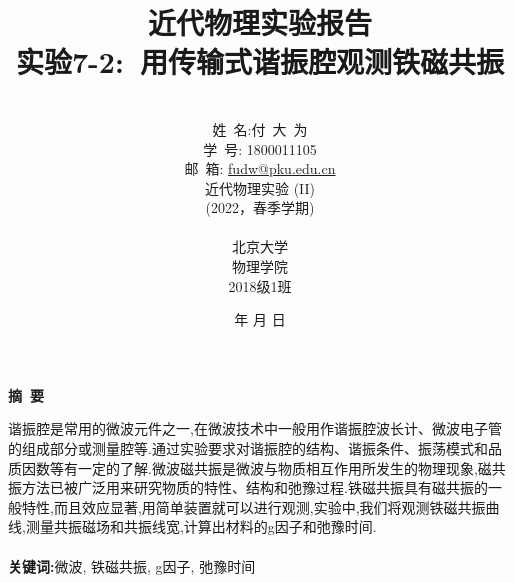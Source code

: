\documentclass[a4paper]{article}
\begin{document}
\setlength{\abovecaptionskip}{0pt}
\setlength{\belowcaptionskip}{0pt}
\renewcommand{\contentsname}{目\ 录}
\renewcommand{\appendixname}{附录}
\renewcommand{\appendixpagename}{附录}
\renewcommand{\refname}{参考文献} 
\renewcommand{\figurename}{图}
\renewcommand{\tablename}{表}
\renewcommand{\today}{\number\year 年 \number\month 月 \number\day 日}
\newcommand{\refeq}[1]{\textbf{Eq.(\ref{#1})}}
\newcommand*{\circled}[1]{\lower.7ex\hbox{\tikz\draw (0pt, 0pt)%
    circle (.5em) node {\makebox[1em][c]{\small #1}};}}
\title{{\Huge 近代物理实验报告{\large\linebreak\\}}{\Large 实验7-2:\ 用传输式谐振腔观测铁磁共振\linebreak\linebreak}}
\author{\\姓\ 名:付\ 大\ 为\\
学\ 号: 1800011105\\
邮\ 箱: \url{fudw@pku.edu.cn}\\
近代物理实验 (II)\\
(2022，春季学期)\\\\
北京大学\\
物理学院\\
2018级1班}
\date{\today}
\maketitle
\newpage

\begin{center}
{\Large\bf{摘\ 要\\}}
\end{center}

谐振腔是常用的微波元件之一,在微波技术中一般用作谐振腔波长计、微波电子管的组成部分或测量腔等.通过实验要求对谐振腔的结构、谐振条件、振荡模式和品质因数等有一定的了解.微波磁共振是微波与物质相互作用所发生的物理现象,磁共振方法已被广泛用来研究物质的特性、结构和弛豫过程.铁磁共振具有磁共振的一般特性,而且效应显著,用简单装置就可以进行观测,实验中,我们将观测铁磁共振曲线,测量共振磁场和共振线宽,计算出材料的g因子和弛豫时间.\\\\
{\bf{关键词}:}微波, 铁磁共振, g因子, 弛豫时间
\newpage
\end{document}

